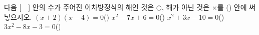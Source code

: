 다음 [\ \ ] 안의 수가 주어진 이차방정식의 해인 것은 $\bigcirc$, 해가 아닌 것은 $\times$를 (\quad) 안에 써넣으시오.
 $(x+2)(x-4)=0$\quad[\,$-2$\,]\hfill(\qquad)
 $x^2-7x+6=0$\quad[\,$1$\,]\hfill(\qquad)
 $x^2+3x-10=0$\quad[\,$-4$\,]\hfill(\qquad)
 $3x^2-8x-3=0$\quad[\,$3$\,]\hfill(\qquad)
